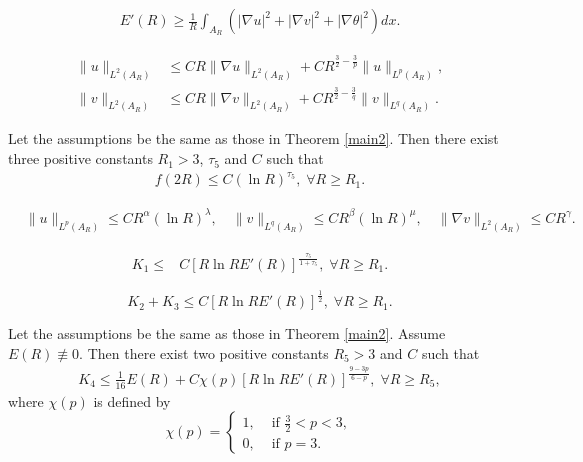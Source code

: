 \documentclass[10pt,a4paper]{amsart}
\begin{document}
	\begin{align}\label{ine4.2}
		E'(R)\geq\frac{1}{R}\int_{A_R}\left(|\nabla u|^{2}+|\nabla v|^{2}+|\nabla \theta|^{2}\right)dx.
	\end{align}

	\begin{align}
		\|u\|_{L^2(A_R)}&\leq CR\|\nabla u\|_{L^2 (A_R)}+CR^{\frac{3}{2}-\frac{3}{p}}\|u\|_{L^p(A_R)},\label{ine4.7}\\
        \|v\|_{L^2(A_R)}&\leq CR\|\nabla v\|_{L^2 (A_R)}+CR^{\frac{3}{2}-\frac{3}{q}}\|v\|_{L^q(A_R)}.\label{ine4.8}
	\end{align}

\begin{Lem}\label{Lem4.3}
Let the assumptions be the same as those in {\rm Theorem \ref{main2}}. Then there exist three positive constants $R_1>3$, $\tau_5$ and $C$ such that
	\begin{align}\label{ine4.14}
		f(2R)\leq C(\ln R)^{\tau_5},\;\forall R\geq R_1.
	\end{align}
\end{Lem}

\begin{align}
&\|u\|_{L^p\left(A_R\right)}\leq CR^\alpha(\ln R)^\lambda,\quad\|v\|_{L^q\left(A_R\right)}\leq CR^\beta(\ln R)^\mu,\quad\|\nabla v\|_{L^2\left(A_R\right)}\leq CR^\gamma.\label{ine4.15}
\end{align}

	\begin{align}\label{ine4.16}
	K_1\leq&C\left[R\ln R E'(R)\right]^\frac{\tau_5}{1+\tau_5},\;\forall R\geq R_1.
	\end{align}

\begin{equation}\label{ine4.17}
K_2+K_3\leq C[R\ln R E'(R)]^\frac{1}{2},\;\forall R\geq R_1.
\end{equation}

\begin{Lem}\label{Lem4.6}
Let the assumptions be the same as those in {\rm Theorem \ref{main2}}. Assume $E(R)\not\equiv0$. Then there exist two positive constants $R_5>3$ and $C$ such that
\begin{align}\label{ine4.18}
K_4\leq \frac{1}{16}E(R)+C\chi(p)\left[R\ln R E'(R)\right]^{\frac{9-3p}{6-p}},\;\forall R\geq R_5,
\end{align}
where $\chi(p)$ is defined by
\begin{equation*}
\chi(p)=
\begin{cases}
1, & \text{ if  }\frac{3}{2}<p<3, \\
0, & \text{ if  } p=3.
\end{cases}
\end{equation*}
\end{Lem}
\end{document}
